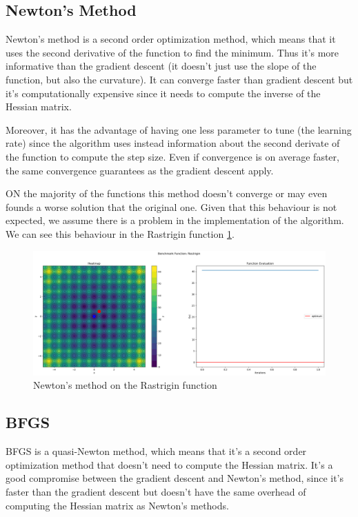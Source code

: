 \subsection{Newton's Method}
\label{sec:newtons-method}
Newton's method is a second order optimization method, which means that it uses the second derivative of the function to find the minimum. Thus it's more informative than the gradient descent (it doesn't just use the slope of the function, but also the curvature). It can converge faster than gradient descent but it's computationally expensive since it needs to compute the inverse of the Hessian matrix.

Moreover, it has the advantage of having one less parameter to tune (the learning rate) since the algorithm uses instead information about the second derivate of the function to compute the step size.
Even if convergence is on average faster, the same convergence guarantees as the gradient descent apply.

ON the majority of the functions this method doesn't converge or may even founds a worse solution that the original one. Given that this behaviour is not expected, we assume there is a problem in the implementation of the algorithm. We can see this behaviour in the Rastrigin function \ref{fig:nm-rastrigin}.
\begin{figure}[H]
    \centering
    \includegraphics[width=0.8\linewidth]{lab3/imgs/nm_rastrigin.png}
    \caption{Newton's method on the Rastrigin function}
    \label{fig:nm-rastrigin}
\end{figure}


\subsection{BFGS}
\label{sec:bfgs}
BFGS is a quasi-Newton method, which means that it's a second order optimization method that doesn't need to compute the Hessian matrix. It's a good compromise between the gradient descent and Newton's method, since it's faster than the gradient descent but doesn't have the same overhead of computing the Hessian matrix as Newton's methods.

